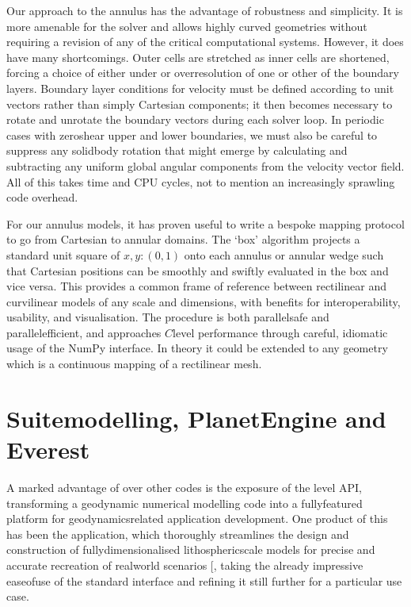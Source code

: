 \documentclass[letterpaper,10pt,english]{jupyterBook}
\begin{document}
\sphinxAtStartPar
Our approach to the annulus has the advantage of robustness and simplicity. It is more amenable for the solver and allows highly curved geometries without requiring a revision of any of the critical computational systems. However, it does have many shortcomings. Outer cells are stretched as inner cells are shortened, forcing a choice of either under\sphinxhyphen{} or over\sphinxhyphen{}resolution of one or other of the boundary layers. Boundary layer conditions for velocity must be defined according to unit vectors rather than simply Cartesian components; it then becomes necessary to rotate and unrotate the boundary vectors during each solver loop. In periodic cases with zero\sphinxhyphen{}shear upper and lower boundaries, we must also be careful to suppress any solid\sphinxhyphen{}body rotation that might emerge by calculating and subtracting any uniform global angular components from the velocity vector field. All of this takes time and CPU cycles, not to mention an increasingly sprawling code overhead.

\sphinxAtStartPar
For our annulus models, it has proven useful to write a bespoke mapping protocol to go from Cartesian to annular domains. The ‘box’ algorithm projects a standard unit square of \(x,y:(0,1)\) onto each annulus or annular wedge such that Cartesian positions can be smoothly and swiftly evaluated in the box and vice versa. This provides a common frame of reference between rectilinear and curvilinear models of any scale and dimensions, with benefits for interoperability, usability, and visualisation. The procedure is both parallel\sphinxhyphen{}safe and parallel\sphinxhyphen{}efficient, and approaches \(C\)\sphinxhyphen{}level performance through careful, idiomatic usage of the NumPy interface. In theory it could be extended to any geometry which is a continuous mapping of a rectilinear mesh.


\section{Suite\sphinxhyphen{}modelling, PlanetEngine and Everest}
\label{\detokenize{content/chapter_02_methods/section3:suite-modelling-planetengine-and-everest}}\label{\detokenize{content/chapter_02_methods/section3::doc}}
\sphinxAtStartPar
A marked advantage of  over other codes is the exposure of the \sphinxhyphen{}level API, transforming a geodynamic numerical modelling code into a fully\sphinxhyphen{}featured platform for geodynamics\sphinxhyphen{}related application development. One product of this has been the  application, which thoroughly streamlines the design and construction of fully\sphinxhyphen{}dimensionalised lithospheric\sphinxhyphen{}scale models for precise and accurate recreation of real\sphinxhyphen{}world scenarios {[}\sphinxcite{references:id71}{]}, taking the already impressive ease\sphinxhyphen{}of\sphinxhyphen{}use of the standard  interface and refining it still further for a particular use case.
\end{document}

